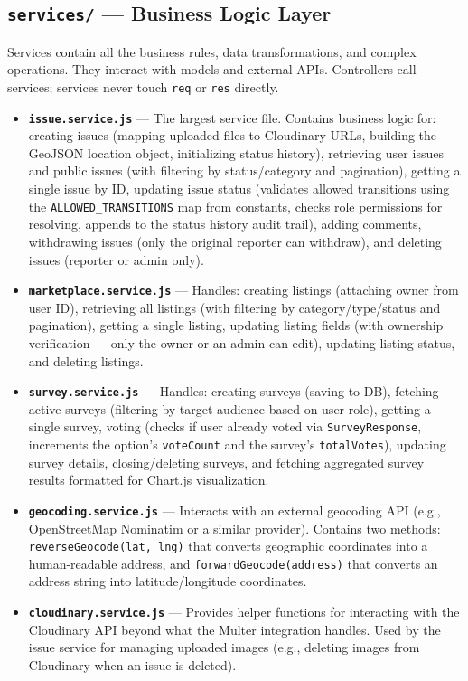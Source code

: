 \documentclass[12pt,a4paper]{article}
\begin{document}
\subsection{\texttt{services/} --- Business Logic Layer}

Services contain all the business rules, data transformations, and complex operations. They interact with models and external APIs. Controllers call services; services never touch \texttt{req} or \texttt{res} directly.

\begin{itemize}[leftmargin=1cm]
  \item \textbf{\texttt{issue.service.js}} --- The largest service file. Contains business logic for: creating issues (mapping uploaded files to Cloudinary URLs, building the GeoJSON location object, initializing status history), retrieving user issues and public issues (with filtering by status/category and pagination), getting a single issue by ID, updating issue status (validates allowed transitions using the \texttt{ALLOWED\_TRANSITIONS} map from constants, checks role permissions for resolving, appends to the status history audit trail), adding comments, withdrawing issues (only the original reporter can withdraw), and deleting issues (reporter or admin only).

  \item \textbf{\texttt{marketplace.service.js}} --- Handles: creating listings (attaching owner from user ID), retrieving all listings (with filtering by category/type/status and pagination), getting a single listing, updating listing fields (with ownership verification --- only the owner or an admin can edit), updating listing status, and deleting listings.

  \item \textbf{\texttt{survey.service.js}} --- Handles: creating surveys (saving to DB), fetching active surveys (filtering by target audience based on user role), getting a single survey, voting (checks if user already voted via \texttt{SurveyResponse}, increments the option's \texttt{voteCount} and the survey's \texttt{totalVotes}), updating survey details, closing/deleting surveys, and fetching aggregated survey results formatted for Chart.js visualization.

  \item \textbf{\texttt{geocoding.service.js}} --- Interacts with an external geocoding API (e.g., OpenStreetMap Nominatim or a similar provider). Contains two methods: \texttt{reverseGeocode(lat, lng)} that converts geographic coordinates into a human-readable address, and \texttt{forwardGeocode(address)} that converts an address string into latitude/longitude coordinates.

  \item \textbf{\texttt{cloudinary.service.js}} --- Provides helper functions for interacting with the Cloudinary API beyond what the Multer integration handles. Used by the issue service for managing uploaded images (e.g., deleting images from Cloudinary when an issue is deleted).
\end{itemize}
\end{document}
